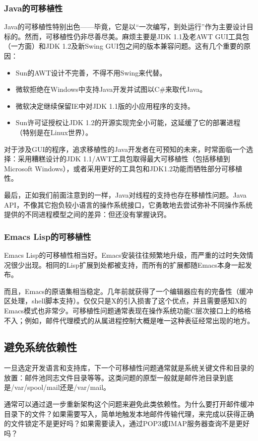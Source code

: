 \documentclass[12pt,oneside]{book}
\begin{document}
\begin{common-format}
\subsubsection{Java的可移植性}
Java的可移植性特别出色——毕竟，它是以“一次编写，到处运行”作为主要设计目标的。然而，可移植性仍非尽善尽美。麻烦主要是JDK 1.1及老AWT GUI工具包（一方面）和JDK 1.2及新Swing GUI包之间的版本兼容问题。这有几个重要的原因：
\begin{itemize}
\item Sun的AWT设计不完善，不得不用Swing来代替。
\item 微软拒绝在Windows中支持Java开发并试图以C\#{}来取代Java。
\item 微软决定继续保留IE中对JDK 1.1版的小应用程序的支持。
\item Sun许可证授权让JDK 1.2的开源实现完全小可能，这延缓了它的部署进程（特别是在Linux世界）。
\end{itemize}

对于涉及GUI的程序，追求移植性的Java开发者在可预知的未来，时常面临一个选择：采用糟糕设计的JDK 1.1/AWT工具包取得最大可移植性（包括移植到Microsoft Windows），或者采用更好的工具包和JDK1.2功能而牺牲部分可移植性。

最后，正如我们前面注意到的一样，Java对线程的支持也存在移植性问题。Java API，不像其它抱负较小语言的操作系统接口，它勇敢地去尝试弥补不同操作系统提供的不同进程模型之间的差异：但还没有掌握诀窍。

\subsubsection{Emacs Lisp的可移植性}
Emacs Lisp的可移植性相当好。Emacs安装往往频繁地升级，而严重的过时失效情况很少出现。相同的Lisp扩展到处都被支持，而所有的扩展都随Emacs本身一起发布。

而且，Emacs的原语集相当稳定。几年前就获得了一个编辑器应有的完备性（缓冲区处理，shell脚本支持）。仅仅只是X的引入损害了这个优点，并且需要感知X的Emacs模式也非常少。可移植性问题通常表现在操作系统功能C层次接口上的格格不入；例如，邮件代理模式的从属进程控制大概是唯一这种表征经常出现的地方。

\subsection{避免系统依赖性}
一旦选定开发语言和支持库，下一个可移植性问题通常就是系统关键文件和目录的放置：邮件池同志文件目录等等。这类问题的原型一般就是邮件池目录到底是/var/spool/mail还是/var/mail。

通常可以通过退一步重新架构这个问题来避免此类依赖性。为什么要打开邮件缓冲目录下的文件？如果需要写入，简单地触发本地邮件传输代理，来完成以获得正确的文件锁定不是更好吗？如果需要读入，通过POP3或IMAP服务器查询不是更好吗？


\end{common-format}
\end{document}
